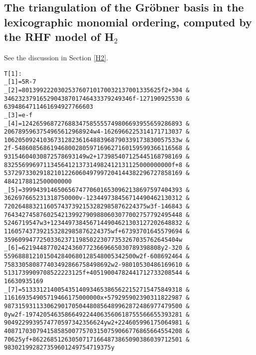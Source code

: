 \subsection*{The triangulation of the Gr\"obner basis in the lexicographic monomial ordering, computed by the RHF model of H$_2$}
See the discussion in Section \ref{H2}.
\begin{verbatim}
T[1]: 
_[1]=5R-7 
_[2]=801399222030253760710170032137001335625f2+304 &
346232379165290438701746433379249346f-127190925530 &
6394864711461694927766603 
_[3]=e-f 
_[4]=124265968727688347585555749806693955659286893 &
2067895963754965612968924w4-1626966225314171713037 &
1062050924103673128236164883968790339173830057533w &
2f-54860856861946800280597169627160159599366116568 &
93154604030872578693149w2+173985407125445168798169 &
83255699697113456412137314982412131125000000000f+8 &
53729733029182101226060497997204144382296727858169 &
4842178812500000000 
_[5]=399943914650656747706016530962138697597404393 &
362697665231318750000v-123449738456714490462130312 &
7202648832116057437392153282985876224375w3f-146843 &
76434274587602542139927909880603077002757792495448 &
5246719547w3+1234497384567144904621303127202648832 &
116057437392153282985876224375wf+67393701645579694 &
3596099477250336237119850223077353267035762645404w 
_[6]=621944877024243607723669665030789398808y2-320 &
5596888121015042840680128548005342500w2f-608692464 &
758330580877403492866758498692w2-98010530486169610 &
5131739909708522223125f+40519004782441712733208544 &
16630935169 
_[7]=513331214005435140934653865622152715475849318 &
116169354905719466175000000x+579295902390311822987 &
98731593113306290170504480856489962872486977479500 &
0yw2f-19742054635866492244063560618755566655393281 &
9049229939574770597342356624yw2+224605996175064981 &
40871703079415858500775703150759066776865664554208 &
70625yf+862268512630507171664873865090386039712501 &
983021992827359601249754719375y 


\end{verbatim}
